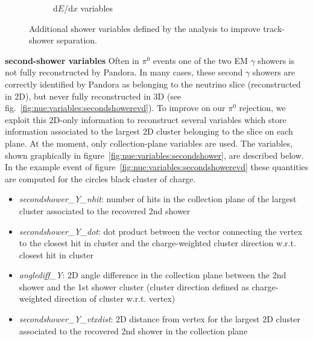 \begin{figure}[H]
\begin{center}
\begin{subfigure}[b]{0.3\textwidth}
    \caption{\label{fig:nue:variables:dedx} d$E$/d$x$ variables }
    \end{subfigure}
\caption{\label{fig:nue:presel:eff} Additional shower variables defined by the analysis to improve track-shower separation.}
\end{center}
\end{figure}


\par \noindent \textbf{second-shower variables} Often in $\pi^0$ events one of the two EM $\gamma$ showers is not fully reconstructed by Pandora. In many cases, these second $\gamma$ showers are correctly identified by Pandora as belonging to the neutrino slice (reconstructed in 2D), but never fully reconstructed in 3D (see fig.~\ref{fig:nue:variables:secondshowerevd}). To improve on our $\pi^0$ rejection, we exploit this 2D-only information to reconstruct several variables which store information associated to the largest 2D cluster belonging to the slice on each plane. At the moment, only collection-plane variables are used. The variables, shown graphically in figure~\ref{fig:nue:variables:secondshower}, are described below. In the example event of figure~\ref{fig:nue:variables:secondshowerevd} these quantities are computed for the circles black cluster of charge.
\begin{itemize}
    \item \emph{secondshower\_Y\_nhit}: number of hits in the collection plane of the largest cluster associated to the  recovered 2nd shower
    \item \emph{secondshower\_Y\_dot}: dot product between the vector connecting the vertex to the closest hit in cluster and the charge-weighted cluster direction w.r.t. closest hit in cluster
    \item \emph{anglediff\_Y}: 2D angle difference in the collection plane between the 2nd shower and the 1st shower cluster  (cluster direction defined as charge-weighted direction of cluster w.r.t. vertex)
    \item \emph{secondshower\_Y\_vtxdist}: 2D distance from vertex for the largest 2D cluster associated to the  recovered 2nd shower in the collection plane
\end{itemize}{}




